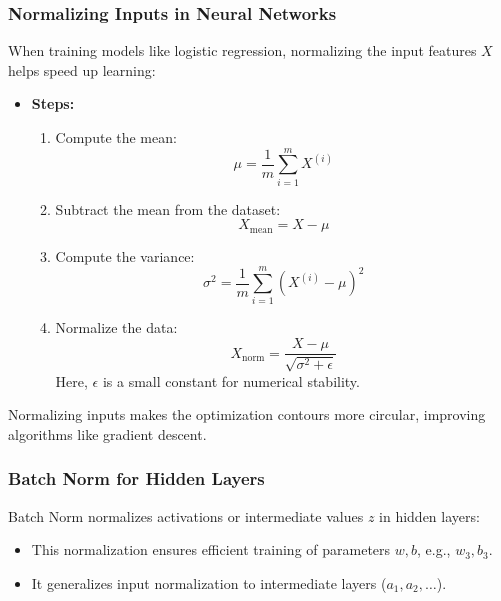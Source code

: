 \documentclass[letterpaper,12pt,notitlepage,twoside]{report}
\begin{document}
\subsubsection{Normalizing Inputs in Neural Networks}
When training models like logistic regression, normalizing the input features \(X\) helps speed up learning:
\begin{itemize}[noitemsep, topsep=0pt]
    \item \textbf{Steps:}
    \begin{enumerate}[noitemsep, topsep=0pt]
        \item Compute the mean: 
        \[
        \mu = \frac{1}{m} \sum_{i=1}^m X^{(i)}
        \]
        \item Subtract the mean from the dataset: 
        \[
        X_{\text{mean}} = X - \mu
        \]
        \item Compute the variance: 
        \[
        \sigma^2 = \frac{1}{m} \sum_{i=1}^m (X^{(i)} - \mu)^2
        \]
        \item Normalize the data:
        \[
        X_{\text{norm}} = \frac{X - \mu}{\sqrt{\sigma^2 + \epsilon}}
        \]
        Here, \(\epsilon\) is a small constant for numerical stability.
    \end{enumerate}
\end{itemize}

Normalizing inputs makes the optimization contours more circular, improving algorithms like gradient descent.

\subsubsection{Batch Norm for Hidden Layers}
Batch Norm normalizes activations or intermediate values \(z\) in hidden layers:
\begin{itemize}[noitemsep, topsep=0pt]
    \item This normalization ensures efficient training of parameters \(w, b\), e.g., \(w_3, b_3\).
    \item It generalizes input normalization to intermediate layers (\(a_1, a_2, \dots\)).
\end{itemize}
\end{document}
